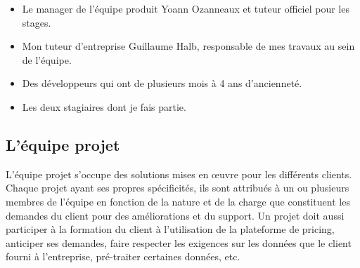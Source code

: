 \documentclass{rapportCS}
\begin{document}
\begin{itemize}
\item{Le manager de l'équipe produit Yoann Ozanneaux et tuteur officiel pour les stages.}
\item{Mon tuteur d'entreprise Guillaume Halb, responsable de mes travaux au sein de l'équipe.}
\item{Des développeurs qui ont de plusieurs mois à 4 ans d'ancienneté.}
\item{Les deux stagiaires dont je fais partie.}
\end{itemize}

\subsection{L'équipe projet}
L'équipe projet s'occupe des solutions mises en œuvre pour les différents clients. Chaque projet ayant ses propres spécificités, ils sont attribués à un ou plusieurs membres de l'équipe en fonction de la nature et de la charge que constituent les demandes du client pour des améliorations et du support. Un projet doit aussi participer à la formation du client à l'utilisation de la plateforme de pricing, anticiper ses demandes, faire respecter les exigences sur les données que le client fourni à l'entreprise, pré-traiter certaines données, etc.
\end{document}
